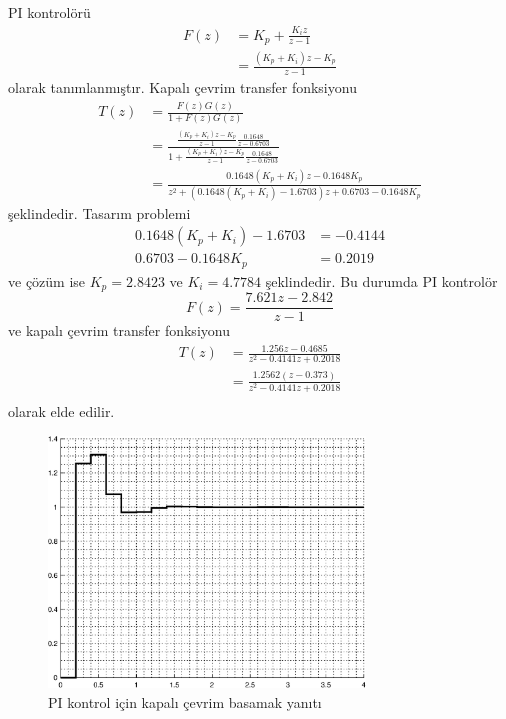 PI kontrolörü 
\begin{equation}
\begin{split}
    F(z)&=K_p+\frac{K_iz}{z-1}\\
    &=\frac{(K_p+K_i)z-K_p}{z-1}
\end{split}
\end{equation}
olarak tanımlanmıştır. Kapalı çevrim transfer fonksiyonu 
\begin{equation}
    \begin{split}
        T(z)&=\frac{F(z)G(z)}{1+F(z)G(z)}\\
        &=\frac{\frac{(K_p+K_i)z-K_p}{z-1}\frac{0.1648}{z-0.6703}}{1+\frac{(K_p+K_i)z-K_p}{z-1}\frac{0.1648}{z-0.6703}}\\
        &=\frac{0.1648(K_p+K_i)z-0.1648K_p}{z^2+(0.1648(K_p+K_i)-1.6703)z+0.6703-0.1648K_p}
    \end{split}
\end{equation}
şeklindedir. Tasarım problemi
\begin{equation}
    \begin{split}
       0.1648(K_p+K_i)-1.6703&=-0.4144\\
       0.6703-0.1648K_p&=0.2019
    \end{split}
\end{equation}
ve çözüm ise $K_p=2.8423$ ve $K_i=4.7784$ şeklindedir. Bu durumda PI kontrolör
\begin{equation}
        F(z)=\frac{7.621 z - 2.842}{z-1}
\end{equation}
ve kapalı çevrim transfer fonksiyonu
\begin{equation}
\begin{split}
    T(z)&=\frac{1.256 z - 0.4685}{z^2 - 0.4141 z + 0.2018}\\
    &=\frac{1.2562 (z-0.373)}{z^2 - 0.4141 z + 0.2018}\\
\end{split}
\end{equation}
olarak elde edilir.

\begin{figure}[!htb]
    \centering
    \includegraphics[width=0.75\textwidth]{img/lec6_step3}
    \caption{PI kontrol için kapalı çevrim basamak yanıtı}
    \label{fig:lec6_step3}
\end{figure}

